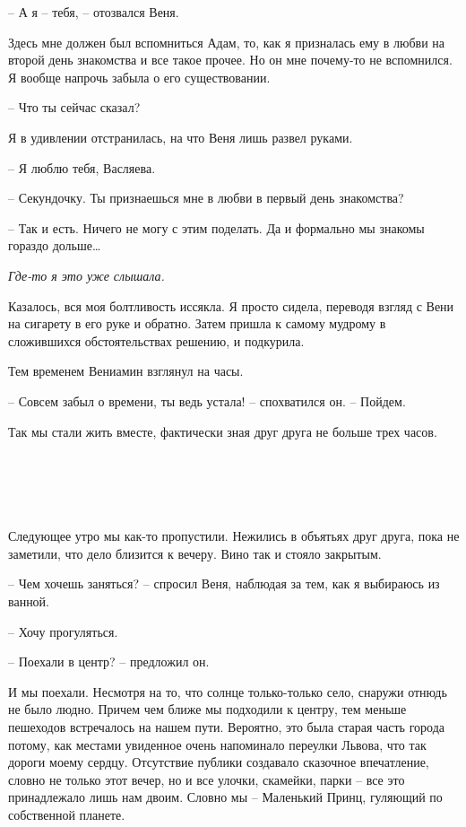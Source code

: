 \documentclass[
]{book}
\begin{document}
-- А я -- тебя, -- отозвался Веня.

Здесь мне должен был вспомниться Адам, то, как я призналась ему в любви на второй день знакомства и все такое прочее. Но он мне почему-то не вспомнился. Я вообще напрочь забыла о его существовании.

-- Что ты сейчас сказал?

Я в удивлении отстранилась, на что Веня лишь развел руками.

-- Я люблю тебя, Васляева.

-- Секундочку. Ты признаешься мне в любви в первый день знакомства?

-- Так и есть. Ничего не могу с этим поделать. Да и формально мы знакомы гораздо дольше\ldots{}

\emph{Где-то я это уже слышала.}

Казалось, вся моя болтливость иссякла. Я просто сидела, переводя взгляд с Вени на сигарету в его руке и обратно. Затем пришла к самому мудрому в сложившихся обстоятельствах решению, и подкурила.

Тем временем Вениамин взглянул на часы.

-- Совсем забыл о времени, ты ведь устала! -- спохватился он. -- Пойдем.

Так мы стали жить вместе, фактически зная друг друга не больше трех часов.

\hypertarget{chapter-10}{%
\chapter{~}\label{chapter-10}}

Следующее утро мы как-то пропустили. Нежились в объятьях друг друга, пока не заметили, что дело близится к вечеру. Вино так и стояло закрытым.

-- Чем хочешь заняться? -- спросил Веня, наблюдая за тем, как я выбираюсь из ванной.

-- Хочу прогуляться.

-- Поехали в центр? -- предложил он.

И мы поехали. Несмотря на то, что солнце только-только село, снаружи отнюдь не было людно. Причем чем ближе мы подходили к центру, тем меньше пешеходов встречалось на нашем пути. Вероятно, это была старая часть города потому, как местами увиденное очень напоминало переулки Львова, что так дороги моему сердцу. Отсутствие публики создавало сказочное впечатление, словно не только этот вечер, но и все улочки, скамейки, парки -- все это принадлежало лишь нам двоим. Словно мы -- Маленький Принц, гуляющий по собственной планете.
\end{document}
